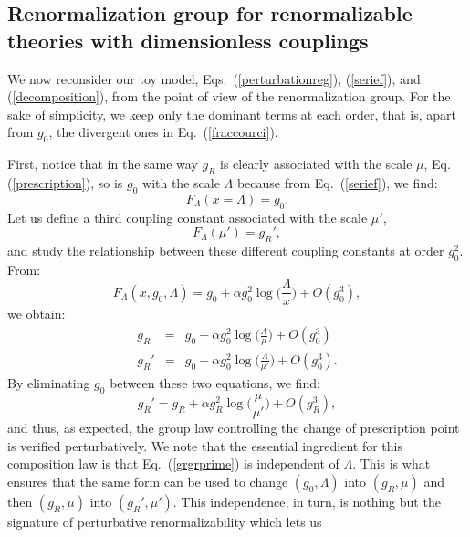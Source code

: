 \documentclass[floatfix,preprintnumbers,amsmath,amssymb,prb,12pt]{revtex4-1}
\begin{document}
\subsection{Renormalization group for renormalizable theories
with dimensionless couplings}

We now reconsider our toy model, Eqs.~(\ref{perturbationreg}),
(\ref{serief}), and (\ref{decomposition}), from the point of view
of the renormalization group. For the sake of simplicity, we keep
only the dominant terms at each order, that is, apart from $g_0$,
the divergent ones in Eq.~(\ref{fraccourci}). 

First, notice that in the same way $g_R$ is clearly associated with the
scale
$\mu$, Eq.(\ref{prescription}), so is $g_0$ with the scale $\Lambda$ because from 
Eq.~(\ref{serief}), we find\cite{foot10}:
\begin{equation}
F_\Lambda(x=\Lambda)=g_0.
\label{eqfoot10}
\end{equation}
Let us define a third coupling constant associated with the scale
$\mu'$,
\begin{equation}
F_\Lambda(\mu')=g_R',
\label{prescriptionprime}
\end{equation}
and study the relationship between these different coupling
constants at order $g_0^2$. From:
\begin{equation}
F_\Lambda(x,g_0,\Lambda)=g_0 + \alpha g_0^2
\log\big(\frac{\Lambda}{x}\big) + O(g_0^3),
\label{fordre2}
\end{equation}
we obtain:
\begin{eqnarray}
g_R&=&g_0 +\alpha g_0^2 \log\big(\frac{\Lambda}{\mu}\big) +
O(g_0^3)\label{grp.a}\\
g_R'&=&g_0 +\alpha g_0^2 \log\big(\frac{\Lambda}{\mu'}\big) +
O(g_0^3).
\label{grp}
\end{eqnarray}
By eliminating $g_0$ between these two equations, we find:
\begin{equation}
g_R'=g_R +\alpha g_R^2 \log\big(\frac{\mu}{\mu'}\big) + O(g_R^3),
\label{grgrprime}
\end{equation}
and thus, as expected, the group law controlling the change of
prescription point is verified perturbatively. We note that
the essential ingredient for this composition law is that
Eq.~(\ref{grgrprime}) is independent of $\Lambda$. This is what
ensures that the same form can be used to change
$(g_0,\Lambda)$ into $(g_R,\mu)$ and then $(g_R,\mu)$ into
$(g_R',\mu')$. This independence, in turn, is nothing but the
signature of perturbative renormalizability which lets us
\end{document}
